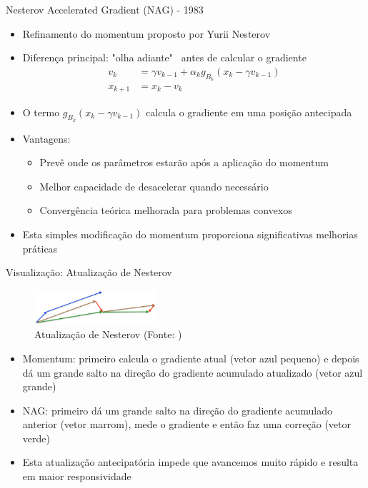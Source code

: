 \documentclass[aspectratio=1610]{beamer}
\begin{document}
\begin{frame}{Nesterov Accelerated Gradient (NAG) - 1983}
\begin{itemize}
    \item Refinamento do momentum proposto por Yurii Nesterov \pause
    \item Diferença principal: "olha adiante"~ antes de calcular o gradiente \pause
    \begin{align*}
        v_k &= \gamma v_{k-1} + \alpha_k g_{B_k}(x_k - \gamma v_{k-1}) \\
        x_{k+1} &= x_k - v_k
    \end{align*} \pause
    \item O termo $g_{B_k}(x_k - \gamma v_{k-1})$ calcula o gradiente em uma posição antecipada \pause
    \item Vantagens: \pause
    \begin{itemize}
        \item Prevê onde os parâmetros estarão após a aplicação do momentum \pause
        \item Melhor capacidade de desacelerar quando necessário \pause
        \item Convergência teórica melhorada para problemas convexos
    \end{itemize} \pause
    \item Esta simples modificação do momentum proporciona significativas melhorias práticas
\end{itemize}
\end{frame}

\begin{frame}{Visualização: Atualização de Nesterov}
\begin{figure}
\centering
\includegraphics[width=0.4\textwidth]{figures/nesterov_update.png}
\caption{Atualização de Nesterov (Fonte: \cite{ruder2017})}
\end{figure}

\begin{itemize}
    \item Momentum: primeiro calcula o gradiente atual (vetor azul pequeno) e depois dá um grande salto na direção do gradiente acumulado atualizado (vetor azul grande)
    \item NAG: primeiro dá um grande salto na direção do gradiente acumulado anterior (vetor marrom), mede o gradiente e então faz uma correção (vetor verde)
    \item Esta atualização antecipatória impede que avancemos muito rápido e resulta em maior responsividade
\end{itemize}
\end{frame}
\end{document}
